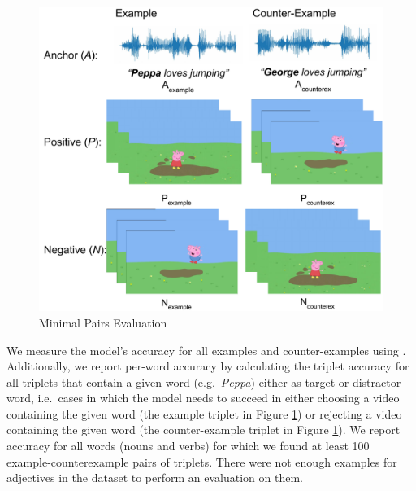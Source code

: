 \begin{figure}[ht]
  \centering
  \includegraphics[width=\columnwidth]{peppa_targeted_triplets.pdf}
  \caption{Minimal Pairs Evaluation}
  \label{fig:minimal_pairs}
\end{figure}

We measure the model's accuracy for all examples and counter-examples using
 . Additionally, we report per-word accuracy by
calculating the triplet accuracy for all triplets that contain a given
word (e.g.\ \textit{Peppa}) either as target or distractor word, i.e.\ cases
in which the model needs to succeed in either choosing a video
containing the given word (the example triplet in Figure
\ref{fig:minimal_pairs}) or rejecting a video containing the given
word (the counter-example triplet in Figure
\ref{fig:minimal_pairs}).
We report accuracy for all words (nouns and verbs) for which we found at least 
100 example-counterexample pairs of triplets. There were not enough examples 
for adjectives in the dataset to perform an evaluation on them. 



